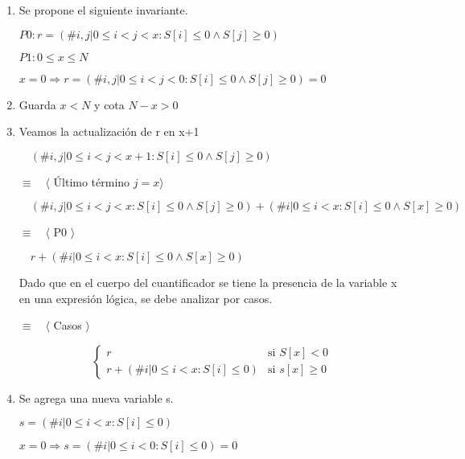 \documentclass[hidelinks]{article}
\begin{document}
\begin{enumerate}
	\item Se propone el siguiente invariante. \par
	      \begin{center}
		      $P0: r = (\# i,j| 0\leq i < j < x :S[i] \leq 0 \land S[j] \geq 0)$ \par
		      $P1: 0 \leq x \leq N$ \par
	      \end{center}
	      $x = 0 \Rightarrow r = (\# i,j| 0\leq i < j < 0 :S[i] \leq 0 \land S[j] \geq 0) = 0$ \par

	\item Guarda $x<N$ y cota $N-x>0 $

	\item Veamos la actualización de r en x+1 \par
	      $\quad (\# i,j| 0\leq i < j < x+1 :S[i] \leq 0 \land S[j] \geq 0)$ \par
	      $\equiv \quad \langle$ Último término $ j = x \rangle$ \par
	      $\quad (\# i,j| 0\leq i < j < x :S[i] \leq 0 \land S[j] \geq 0) + (\# i| 0\leq i < x :S[i] \leq 0 \land S[x] \geq 0) $ \par
	      $\equiv \quad \langle$ P0 $\rangle$ \par
	      $\quad r + (\# i| 0\leq i < x :S[i] \leq 0 \land S[x] \geq 0)$ \par

	      Dado que en el cuerpo del cuantificador se tiene la presencia de la variable x
	      en una expresión lógica, se debe analizar por casos.

	      $\equiv \quad \langle$ Casos $\rangle$ \par
	      \begin{equation}
		      \begin{cases}
			      r                                    & \text{si } S[x] < 0    \\
			      r + (\# i| 0\leq i < x :S[i] \leq 0) & \text{si } s[x] \geq 0
		      \end{cases}
	      \end{equation} \par

	\item Se agrega una nueva variable s. \par
	      $s = (\# i| 0\leq i < x :S[i] \leq 0)$ \par
	      $x=0 \Rightarrow s = (\# i| 0\leq i < 0 :S[i] \leq 0)=0$ \par


\end{enumerate}
\end{document}
